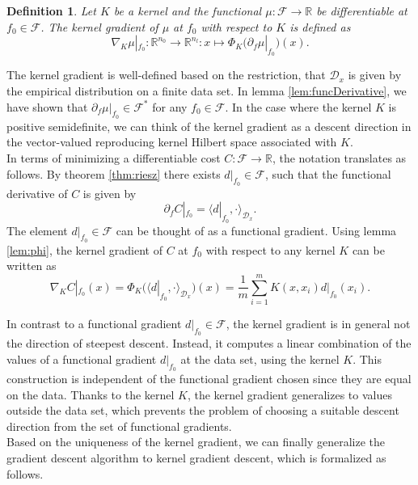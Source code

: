 \documentclass[11pt, a4paper]{article}
\newtheorem{definition}[theorem]{Definition}
\newcommand{\R}{\mathbb{R}}
\newcommand{\D}{\mathcal{D}}
\newcommand{\F}{\mathcal{F}}
\begin{document}
\begin{definition}
Let $K$ be a kernel and the functional $\mu : \F \to \R$ be differentiable at $f_0 \in \F$. The kernel gradient of $\mu$ at $f_0$ with respect to $K$ is defined as
\[ \nabla_K\mu|_{f_0}: \R^{n_0} \to \R^{n_l} : x \mapsto \Phi_K \Big ( \partial_f\mu|_{f_0} \Big )(x). \]
\end{definition}

The kernel gradient is well-defined based on the restriction, that $\D_x$ is given by the empirical distribution on a finite data set. In lemma \ref{lem:funcDerivative}, we have shown that  $\partial_f \mu |_{f_0} \in \F^*$ for any $f_0 \in \F$. In the case where the kernel $K$ is positive semidefinite, we can think of the kernel gradient as a descent direction in the vector-valued reproducing kernel Hilbert space associated with $K$. \\

In terms of minimizing a differentiable cost $C: \F \to \R$, the notation translates as follows. By theorem \ref{thm:riesz} there exists $d|_{f_0} \in \F$, such that the functional derivative of $C$ is given by
\[ \partial_{f} C |_{f_0} = \big \langle d|_{f_0}, \cdot \big \rangle_{\D_x}. \]
The element $d|_{f_0} \in \F$ can be thought of as a functional gradient. Using lemma \ref{lem:phi}, the kernel gradient of $C$ at $f_0$ with respect to any kernel $K$ can be written as
\[ \nabla_KC|_{f_0}(x) = \Phi_K \Big ( \big \langle d|_{f_0} , \cdot \big \rangle_{\D_x} \Big )(x) = \frac{1}{m} \sum_{i=1}^{m} K(x,x_i)d|_{f_0}(x_i). \]

In contrast to a functional gradient $d|_{f_0} \in \F$, the kernel gradient is in general not the direction of steepest descent. Instead, it computes a linear combination of the values of a functional gradient $d|_{f_0}$ at the data set, using the kernel $K$. This construction is independent of the functional gradient chosen since they are equal on the data. Thanks to the kernel $K$, the kernel gradient generalizes to values outside the data set, which prevents the problem of choosing a suitable descent direction from the set of functional gradients. \\

Based on the uniqueness of the kernel gradient, we can finally generalize the gradient descent algorithm to kernel gradient descent, which is formalized as follows.
\end{document}

